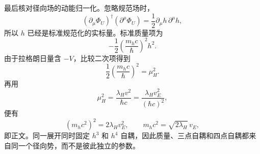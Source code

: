 \begin{derivation}
最后核对径向场的动能归一化。忽略规范场时，
\begin{equation*}
 (\partial_\mu\Phi_U)^\dagger(\partial^\mu\Phi_U)
 =\frac12\partial_\mu h\,\partial^\mu h,
\end{equation*}
所以 $h$ 已经是标准规范化的实标量。标准质量项为
\begin{equation*}
 -\frac12\left(\frac{m_hc}{\hbar}\right)^2h^2.
\end{equation*}
由于拉格朗日量含 $-V$，比较二次项得到
\begin{equation*}
 \frac12\left(\frac{m_hc}{\hbar}\right)^2=\mu_H^2.
\end{equation*}
再用
\begin{equation*}
 \mu_H^2=\frac{\lambda_Hv^2}{\hbar c}
 =\frac{\lambda_Hv_E^2}{(\hbar c)^2},
\end{equation*}
便有
\begin{equation*}
 (m_hc^2)^2=2\lambda_Hv_E^2,
 \qquad
 \boxed{m_hc^2=\sqrt{2\lambda_H}\,v_E},
\end{equation*}
即正文。同一展开同时固定 $h^3$ 和 $h^4$ 自耦，因此质量、三点自耦和四点自耦都来自同一个径向势，而不是彼此独立的参数。
\end{derivation}





